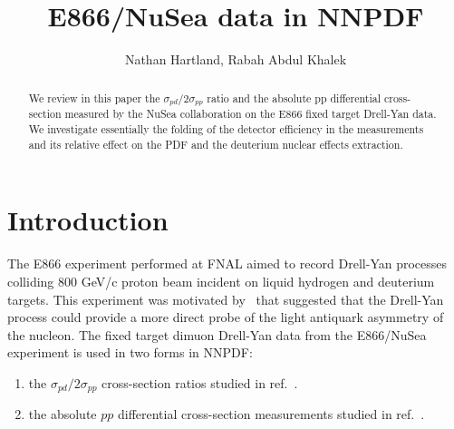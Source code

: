 \documentclass[11pt]{article}
\title{E866/NuSea data in NNPDF}
\author{Nathan Hartland, Rabah Abdul Khalek}
\begin{document}
\maketitle

\begin{abstract}
We review in this paper the $\sigma_{pd}/2\sigma_{pp}$ ratio and the absolute pp differential cross-section measured by the NuSea collaboration on the E866 fixed target Drell-Yan data. We investigate essentially the folding of the detector efficiency in the measurements and its relative effect on the PDF and the deuterium nuclear effects extraction.
\end{abstract}

\section{Introduction}
The E866 experiment performed at FNAL aimed to record Drell-Yan processes colliding 800 GeV/c proton beam incident on liquid hydrogen and deuterium targets. This experiment was motivated by~\cite{Ellis:1991} that suggested that the Drell-Yan process could provide a more direct probe of the light antiquark asymmetry of the nucleon.
The fixed target dimuon Drell-Yan data from the E866/NuSea experiment is used in two forms in NNPDF:
\begin{enumerate}
    \item the $\sigma_{pd}/2\sigma_{pp}$ cross-section ratios studied in ref.~\cite{Towell:2001nh}.
    \item the absolute $pp$ differential cross-section measurements studied in ref.~\cite{Webb:2003ps}.
\end{enumerate}
\end{document}
